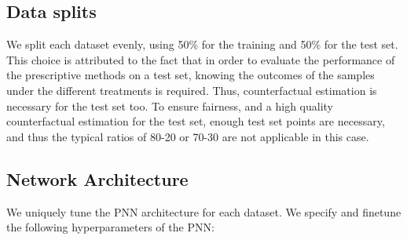 \documentclass[10pt]{article} %
\begin{document}
\subsection{Data splits}
We split each dataset evenly, using 50\% for the training and 50\% for the test set. This choice is attributed to the fact that in order to evaluate the performance of the prescriptive methods on a test set, knowing the outcomes of the samples under the different treatments is required. Thus, counterfactual estimation is necessary for the test set too. To ensure fairness, and a high quality counterfactual estimation for the test set, enough test set points are necessary, and thus the typical ratios of 80-20 or 70-30 are not applicable in this case.

\subsection{Network Architecture}
We uniquely tune the PNN architecture for each dataset. We specify and finetune the following hyperparameters of the PNN:
\end{document}
